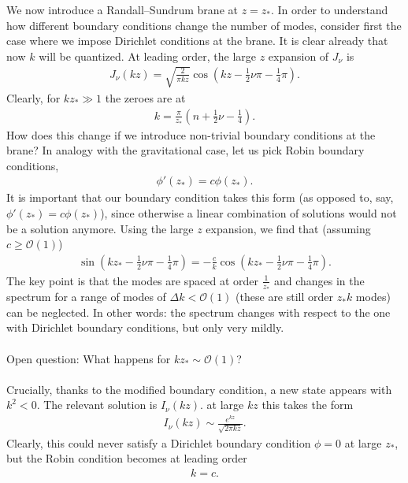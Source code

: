 We now introduce a Randall--Sundrum brane at $z = z_*$. In order to understand how different boundary conditions change the number of modes, consider first the case where we impose Dirichlet conditions at the brane. It is clear already that now $k$ will be quantized. At leading order, the large $z$ expansion of $J_\nu$ is
\begin{align}
    J_\nu(k z) = \sqrt{\frac{2} {\pi k z}} \cos(k z - \frac 1 2 \nu \pi - \frac 1 4 \pi).
\end{align}
Clearly, for $k z_* \gg 1$ the zeroes are at 
\begin{align}
    k = \frac{\pi}{z_*} (n + \frac 1 2 \nu - \frac 1 4).
\end{align}
How does this change if we introduce non-trivial boundary conditions at the brane? In analogy with the gravitational case, let us pick Robin boundary conditions,
\begin{align}
    \phi'(z_*) = c \phi(z_*).
\end{align}
It is important that our boundary condition takes this form (as opposed to, say, $\phi'(z_*) = c \phi(z_*)$), since otherwise a linear combination of solutions would not be a solution anymore. Using the large $z$ expansion, we find that (assuming $c \geq \mathcal O(1)$)
\begin{align}
   \sin(k z_* - \frac 1 2 \nu \pi - \frac 1 4 \pi) = -\frac{c}{k} \cos(k z_* - \frac 1 2 \nu \pi - \frac 1 4 \pi).
\end{align}
The key point is that the modes are spaced at order $\frac 1 {z_*}$ and changes in the spectrum for a range of modes of $\Delta k < \mathcal O(1)$ (these are still order $z_* k$ modes) can be neglected. In other words: the spectrum changes with respect to the one with Dirichlet boundary conditions, but only very mildly.
\\
\\
Open question: What happens for $k z_* \sim \mathcal O(1)$?
\\
\\
Crucially, thanks to the modified boundary condition, a new state appears with $k^2 < 0$. The relevant solution is $I_\nu(k z)$. at large $k z$ this takes the form
\begin{align}
    I_\nu(k z) \sim \frac{e^{kz}}{\sqrt{2 \pi k z}}.
\end{align}
Clearly, this could never satisfy a Dirichlet boundary condition $\phi = 0$ at large $z_*$, but the Robin condition becomes at leading order
\begin{align}
    k = c.
\end{align}

